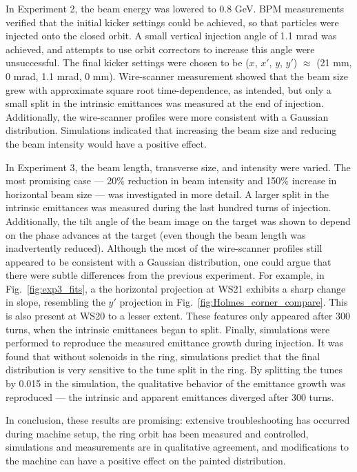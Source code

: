 In Experiment 2, the beam energy was lowered to 0.8 GeV. BPM measurements verified that the initial kicker settings could be achieved, so that particles were injected onto the closed orbit. A small vertical injection angle of 1.1 mrad was achieved, and attempts to use orbit correctors to increase this angle were unsuccessful. The final kicker settings were chosen to be ($x$, $x'$, $y$, $y'$) $\approx$ (21 mm, 0 mrad, 1.1 mrad, 0 mm). Wire-scanner measurement showed that the beam size grew with approximate square root time-dependence, as intended, but only a small split in the intrinsic emittances was measured at the end of injection. Additionally, the wire-scanner profiles were more consistent with a Gaussian distribution. Simulations indicated that increasing the beam size and reducing the beam intensity would have a positive effect. 

In Experiment 3, the beam length, transverse size, and intensity were varied. The most promising case — 20\% reduction in beam intensity and 150\% increase in horizontal beam size — was investigated in more detail. A larger split in the intrinsic emittances was measured during the last hundred turns of injection. Additionally, the tilt angle of the beam image on the target was shown to depend on the phase advances at the target (even though the beam length was inadvertently reduced). Although the most of the wire-scanner profiles still appeared to be consistent with a Gaussian distribution, one could argue that there were subtle differences from the previous experiment. For example, in Fig.~\ref{fig:exp3_fits}, a the horizontal projection at WS21 exhibits a sharp change in slope, resembling the $y'$ projection in Fig.~\ref{fig:Holmes_corner_compare}. This is also present at WS20 to a lesser extent. These features only appeared after 300 turns, when the intrinsic emittances began to split. Finally, simulations were performed to reproduce the measured emittance growth during injection. It was found that without solenoids in the ring, simulations predict that the final distribution is very sensitive to the tune split in the ring. By splitting the tunes by 0.015 in the simulation, the qualitative behavior of the emittance growth was reproduced — the intrinsic and apparent emittances diverged after 300 turns. 

In conclusion, these results are promising: extensive troubleshooting has occurred during machine setup, the ring orbit has been measured and controlled, simulations and measurements are in qualitative agreement, and modifications to the machine can have a positive effect on the painted distribution.
